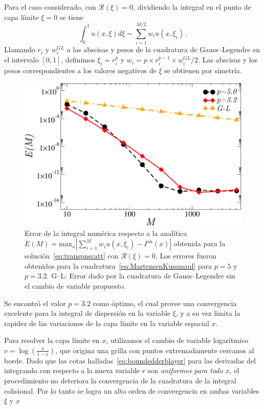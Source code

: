 Para el caso considerado, con $\mathcal{R}(\xi)=0$, 
dividiendo la integral en el punto de capa límite $\xi=0$ se tiene 
\begin{equation}
\int_{0}^{1} u(x,\xi) d\xi \sim \sum_{i=1}^{M/2} w_i u(x,\xi_i) \, .
\label{eq:MartensenKussmaul}
\end{equation}
Llamando $r_i$ y $w_i^{GL}$ a las abscisas y pesos de la 
cuadratura de Gauss--Legendre en el intervalo $[0,1]$, 
definimos $\xi_i=r_i^p$ y $w_i= p \times r_i^{p-1} \times w_i^{GL}/2$. 
Las abscisas y los pesos correspondientes a los valores negativos 
de $\xi$ se obtienen por simetría. 
\begin{figure}[h!]
\centering
  \includegraphics[width=0.5\linewidth]{figuras/quads.pdf}
  \caption{Error de la integral numérica respecto a la 
  analítica $E(M)=\text{max}_x |\sum_{i=1}^M w_i u(x,\xi_i)-I^{\text{an}}(x)|$
  obtenida para la solución~\eqref{eq:transpnscatt} con $\mathcal{R}(\xi)=0$. 
  Los errores fueron obtenidos para la cuadratura~\eqref{eq:MartensenKussmaul} 
  para $p=5$ y $p=3.2$. G--L: 
  Error dado por la cuadratura de Gauss--Legendre sin el cambio de variable propuesto.}
 \label{fig:intconvs}
\end{figure}
Se encontró el valor $p=3.2$ como óptimo, el cual 
provee una convergencia excelente para la integral 
de dispersión en la variable $\xi$, y a su vez limita la rapidez 
de las variaciones de la capa límite en la variable espacial $x$. 

Para resolver la capa límite en $x$, utilizamos 
el cambio de variable logarítmico $v=\log(\frac{x}{1-x})$, 
que origina una grilla con puntos extremadamente cercanos al borde. 
Dado que las cotas halladas~\eqref{eq:boundedderblayer} para las derivadas del 
integrando con respecto a la nueva variable $r$ son {\em uniformes para todo $x$},  
el procedimiento no deteriora la convergencia de la 
cuadratura de la integral colisional.  Por lo tanto 
se logra un alto orden de convergencia en ambas variables $\xi$ y $x$

